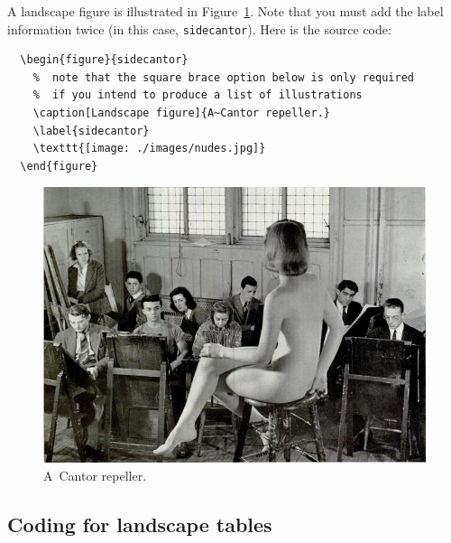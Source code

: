A landscape figure is illustrated in Figure~\ref{sidecantor}. Note that you must add the label information twice (in this case, \verb"sidecantor"). Here is the source code:
\begin{verbatim}
  \begin{figure}{sidecantor}
    %  note that the square brace option below is only required
    %  if you intend to produce a list of illustrations
    \caption[Landscape figure]{A~Cantor repeller.}
    \label{sidecantor}
    \texttt{[image: ./images/nudes.jpg]}
  \end{figure}
\end{verbatim}
  \begin{figure}%
    \caption[Landscape figure]{A~Cantor repeller.}
    \label{sidecantor}
    \includegraphics[scale=0.85]{./images/yaleartschool.png}
  \end{figure}

\subsection{Coding for landscape tables}

